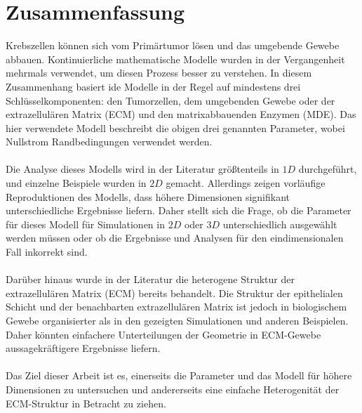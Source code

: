 \section*{Zusammenfassung}

Krebszellen können sich vom Primärtumor lösen und das umgebende Gewebe abbauen. 
Kontinuierliche mathematische Modelle wurden in der Vergangenheit mehrmals verwendet, um diesen Prozess besser zu verstehen. In diesem Zusammenhang basiert ide Modelle in der Regel auf mindestens drei Schlüsselkomponenten: den Tumorzellen, dem umgebenden Gewebe oder der extrazellulären Matrix (ECM) und den matrixabbauenden Enzymen (MDE). Das hier verwendete Modell beschreibt die obigen drei genannten Parameter, wobei Nullstrom Randbedingungen verwendet werden. \\ \\
Die Analyse dieses Modells wird in der Literatur größtenteils in $1D$ durchgeführt, und einzelne Beispiele wurden in $2D$ gemacht. Allerdings zeigen vorläufige Reproduktionen des Modells, dass höhere Dimensionen signifikant unterschiedliche 
Ergebnisse liefern.
Daher stellt sich die Frage, ob die Parameter für dieses Modell für Simulationen in $2D$ oder $3D$ unterschiedlich ausgewählt werden müssen oder ob die Ergebnisse und Analysen für den eindimensionalen Fall inkorrekt sind. \\ \\
Darüber hinaus wurde in der Literatur die heterogene Struktur der extrazellulären Matrix (ECM) bereits behandelt. Die Struktur der epithelialen Schicht und der benachbarten extrazellulären Matrix ist jedoch in biologischem Gewebe organisierter als in den gezeigten Simulationen und anderen Beispielen. Daher könnten einfachere Unterteilungen der Geometrie in ECM-Gewebe aussagekräftigere Ergebnisse liefern. \\ \\
Das Ziel dieser Arbeit ist es, einerseits die Parameter und das Modell für höhere 
Dimensionen zu untersuchen und andererseits eine einfache Heterogenität der ECM-Struktur 
in Betracht zu ziehen.

\clearpage
